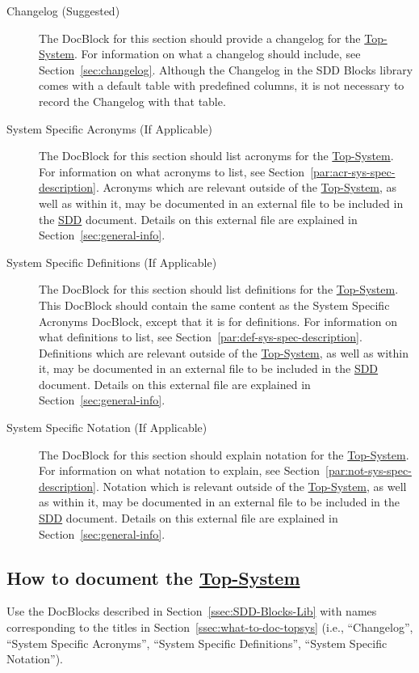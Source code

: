 \documentclass{mcscert}
\newcommand{\topsystemnolink}{Top-System} %
\newcommand{\topsystem}{\hyperref[def:topsystem]{\topsystemnolink{}}}
\begin{document}
	\begin{description}
		\item[Changelog\label{itm:changelog} (Suggested)] The \textsf{DocBlock} for this section should provide a changelog for the \topsystem{}. 
		For information on what a changelog should include, see Section~\ref{sec:changelog}. 
		Although the Changelog in the SDD Blocks library comes with a default table with predefined columns, it is not necessary to record the Changelog with that table.
	  
		\item[System Specific Acronyms\label{itm:sys-acrs} (If Applicable)] The \textsf{DocBlock} for this section should list acronyms for the \topsystem{}. 
		For information on what acronyms to list, see Section~\ref{par:acr-sys-spec-description}. 
		Acronyms which are relevant outside of the \topsystem{}, as well as within it, may be documented in an external file to be included in the \hyperref[acr:sdd]{SDD} document. 
		Details on this external file are  explained in Section~\ref{sec:general-info}.
	  
		\item[System Specific Definitions\label{itm:sys-defs} (If Applicable)] The \textsf{DocBlock} for this section should list definitions for the \topsystem{}. 
		This \textsf{DocBlock} should contain the same content as the System Specific Acronyms \textsf{DocBlock}, except that it is for definitions. 
		For information on what definitions to list, see Section~\ref{par:def-sys-spec-description}. 
		Definitions which are relevant outside of the \topsystem{}, as well as within it, may be documented in an external file to be included in the \hyperref[acr:sdd]{SDD} document. 
		Details on this external file are explained in Section~\ref{sec:general-info}. 
  	  
		\item[System Specific Notation\label{itm:sys-not} (If Applicable)] The \textsf{DocBlock} for this section should explain notation for the \topsystem{}. 
		For information on what notation to explain, see Section~\ref{par:not-sys-spec-description}. 
		Notation which is relevant outside of the \topsystem{}, as well as within it, may be documented in an external file to be included in the \hyperref[acr:sdd]{SDD} document. 
		Details on this external file are explained in Section~\ref{sec:general-info}. 
	\end{description}
  	
	\subsection{How to document the \topsystem{}}
	Use the \textsf{DocBlocks} described in Section~\ref{ssec:SDD-Blocks-Lib} with names corresponding to the titles in Section~\ref{ssec:what-to-doc-topsys} (i.e., ``Changelog'', ``System Specific Acronyms'', ``System Specific Definitions'', ``System Specific Notation'').
\end{document}
